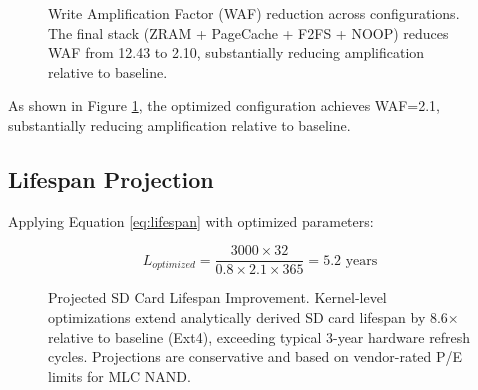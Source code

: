 \documentclass[conference]{IEEEtran}
\begin{document}
\begin{figure}[t]
\centering
{}
\caption{Write Amplification Factor (WAF) reduction across configurations. The final stack (ZRAM + PageCache + F2FS + NOOP) reduces WAF from 12.43 to 2.10, substantially reducing amplification relative to baseline.}
\label{fig:waf_comparison}
\end{figure}

As shown in Figure \ref{fig:waf_comparison}, the optimized configuration achieves WAF=2.1, substantially reducing amplification relative to baseline.

\subsection{Lifespan Projection}

Applying Equation \ref{eq:lifespan} with optimized parameters:

\begin{equation}
L_{optimized} = \frac{3000 \times 32}{0.8 \times 2.1 \times 365} = 5.2 \text{ years}
\end{equation}

\begin{figure}[t]
\centering
{}
\caption{Projected SD Card Lifespan Improvement. Kernel-level optimizations extend analytically derived SD card lifespan by 8.6$\times$ relative to baseline (Ext4), exceeding typical 3-year hardware refresh cycles. Projections are conservative and based on vendor-rated P/E limits for MLC NAND.}
\label{fig:lifespan_projection}
\end{figure}
\end{document}
